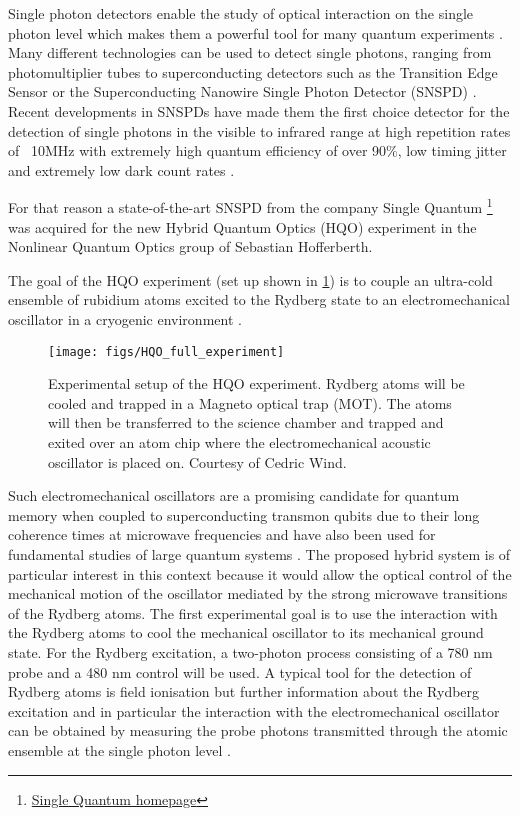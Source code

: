 Single photon detectors enable the study of optical interaction on the single photon level which makes them a powerful
tool for many quantum experiments \cite{charaev-2023, unknown-author-2023}.
Many different technologies can be used to detect single photons, ranging from photomultiplier tubes to
superconducting detectors such as the Transition Edge Sensor or the Superconducting Nanowire Single Photon Detector (SNSPD)
\cite{eisaman-2011}.
Recent developments in SNSPDs have made them the first choice detector for the detection of single photons
in the visible to infrared range at high repetition rates of ~10MHz with extremely high quantum efficiency of over 90$\%$,
low timing jitter and extremely low dark count rates \cite{you-2020}.

For that reason a state-of-the-art SNSPD from the company Single Quantum \footnote{\href{https://www.singlequantum.com/technology/snspd/}{Single Quantum homepage}}
was acquired for the new Hybrid Quantum Optics (HQO) experiment in the Nonlinear Quantum Optics group of Sebastian Hofferberth.

The goal of the HQO experiment (set up shown in \ref{fig:HQO_full_experiment}) is to couple an ultra-cold ensemble of rubidium atoms excited to the Rydberg state to
an electromechanical oscillator in a cryogenic environment \cite{stevenson-2016, gao-2011}.

\begin{figure}[hbt!]
 \centering
 \texttt{[image: figs/HQO\_full\_experiment]}
 \caption{Experimental setup of the HQO experiment. Rydberg atoms will be cooled and trapped in
 a Magneto optical trap (MOT).
 The atoms will then be transferred to the science chamber and trapped and exited over an atom chip where the
 electromechanical acoustic oscillator is placed on. Courtesy of Cedric Wind.}
 \label{fig:HQO_full_experiment}
\end{figure}

Such electromechanical oscillators are a promising candidate for quantum memory when coupled to superconducting
transmon qubits due to their long coherence times at microwave frequencies \cite{chu-2017}
and have also been used for fundamental studies of large quantum systems \cite{bild-2023}.
The proposed hybrid system is of particular interest in this context because it would allow the optical control of the
mechanical motion of the oscillator mediated by the strong microwave transitions of the Rydberg atoms.
The first experimental goal is to use the interaction with the Rydberg atoms to cool the mechanical oscillator to its
mechanical ground state.
For the Rydberg excitation, a two-photon process consisting of a 780 nm probe and a 480 nm control will be used.
A typical tool for the detection of Rydberg atoms is field ionisation \cite{low-2012} but further information about the
Rydberg excitation and in particular the interaction with the electromechanical oscillator can be obtained by
measuring the probe photons transmitted through the atomic ensemble at the single photon level \cite{peyronel-2012, firstenberg-2013}.

